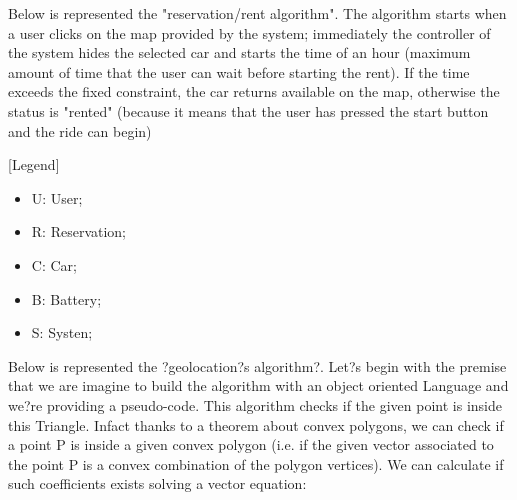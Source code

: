 Below is represented the "reservation/rent algorithm". The algorithm starts when a user clicks on the map provided by the system; immediately the controller of the system hides the selected car and starts the time of an hour (maximum amount of time that the user can wait before starting the rent). If the time exceeds the fixed constraint, the car returns available on the map, otherwise the status is "rented" (because it means that the user has pressed the start button and the ride can begin)

[Legend]
\begin{itemize}
	\item U: User;
	\item R: Reservation;
	\item C:  Car;
	\item B: Battery;
	\item S: Systen;
\end{itemize}



Below is represented the ?geolocation?s algorithm?. Let?s begin with the premise that we are imagine to build the algorithm with an object oriented Language and we?re providing a pseudo-code. This algorithm checks if the given point is inside this Triangle. Infact thanks to a theorem about convex polygons, we can check if a point P is inside a given convex polygon (i.e. if the given vector associated to the point P is a convex combination of the polygon vertices). We can calculate if such coefficients exists solving a vector equation:

